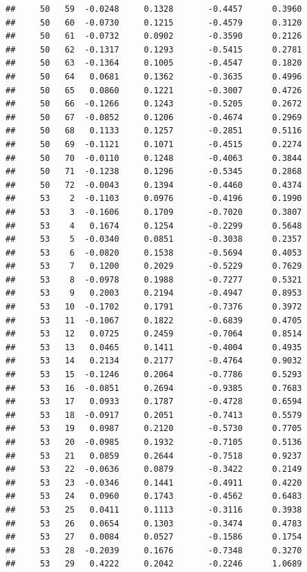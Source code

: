 \documentclass[
]{article}
\begin{document}
\begin{verbatim}
##     50   59  -0.0248     0.1328       -0.4457      0.3960 
##     50   60  -0.0730     0.1215       -0.4579      0.3120 
##     50   61  -0.0732     0.0902       -0.3590      0.2126 
##     50   62  -0.1317     0.1293       -0.5415      0.2781 
##     50   63  -0.1364     0.1005       -0.4547      0.1820 
##     50   64   0.0681     0.1362       -0.3635      0.4996 
##     50   65   0.0860     0.1221       -0.3007      0.4726 
##     50   66  -0.1266     0.1243       -0.5205      0.2672 
##     50   67  -0.0852     0.1206       -0.4674      0.2969 
##     50   68   0.1133     0.1257       -0.2851      0.5116 
##     50   69  -0.1121     0.1071       -0.4515      0.2274 
##     50   70  -0.0110     0.1248       -0.4063      0.3844 
##     50   71  -0.1238     0.1296       -0.5345      0.2868 
##     50   72  -0.0043     0.1394       -0.4460      0.4374 
##     53    2  -0.1103     0.0976       -0.4196      0.1990 
##     53    3  -0.1606     0.1709       -0.7020      0.3807 
##     53    4   0.1674     0.1254       -0.2299      0.5648 
##     53    5  -0.0340     0.0851       -0.3038      0.2357 
##     53    6  -0.0820     0.1538       -0.5694      0.4053 
##     53    7   0.1200     0.2029       -0.5229      0.7629 
##     53    8  -0.0978     0.1988       -0.7277      0.5321 
##     53    9   0.2003     0.2194       -0.4947      0.8953 
##     53   10  -0.1702     0.1791       -0.7376      0.3972 
##     53   11  -0.1067     0.1822       -0.6839      0.4705 
##     53   12   0.0725     0.2459       -0.7064      0.8514 
##     53   13   0.0465     0.1411       -0.4004      0.4935 
##     53   14   0.2134     0.2177       -0.4764      0.9032 
##     53   15  -0.1246     0.2064       -0.7786      0.5293 
##     53   16  -0.0851     0.2694       -0.9385      0.7683 
##     53   17   0.0933     0.1787       -0.4728      0.6594 
##     53   18  -0.0917     0.2051       -0.7413      0.5579 
##     53   19   0.0987     0.2120       -0.5730      0.7705 
##     53   20  -0.0985     0.1932       -0.7105      0.5136 
##     53   21   0.0859     0.2644       -0.7518      0.9237 
##     53   22  -0.0636     0.0879       -0.3422      0.2149 
##     53   23  -0.0346     0.1441       -0.4911      0.4220 
##     53   24   0.0960     0.1743       -0.4562      0.6483 
##     53   25   0.0411     0.1113       -0.3116      0.3938 
##     53   26   0.0654     0.1303       -0.3474      0.4783 
##     53   27   0.0084     0.0527       -0.1586      0.1754 
##     53   28  -0.2039     0.1676       -0.7348      0.3270 
##     53   29   0.4222     0.2042       -0.2246      1.0689 

\end{verbatim}
\end{document}
